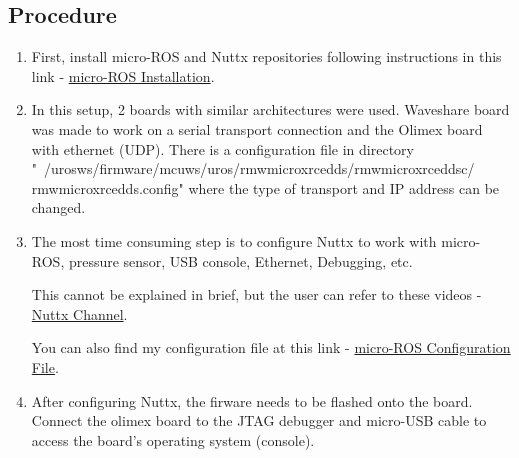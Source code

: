 \documentclass[%
xelatex,
	oneside,		%
	12pt,			%
	parskip=half,	%
	abstracton,
	chapterprefix=true%
    appendixprefix=true]
{scrbook}
\begin{document}
	\subsection{Procedure}	
	\vspace*{0.5cm}
	\begin{enumerate}
	\item First, install micro-ROS and Nuttx repositories following instructions in this link - \href{https://micro-ros.github.io/docs/tutorials/basic/getting_started/}{micro-ROS Installation}\cite{urosinstall}.
	\item In this setup, 2 boards with similar architectures were used. Waveshare board was made to work on a serial transport connection and the Olimex board with ethernet (UDP). There is a configuration file in directory "~/uros\textunderscore ws/firmware/mcu\textunderscore ws/uros/rmw\textunderscore microxrcedds/rmw\textunderscore microxrcedds\textunderscore c/\linebreak
	rmw\textunderscore microxrcedds.config" where the type of transport and IP address can be changed.
	\item The most time consuming step is to configure Nuttx to work with micro-ROS, pressure sensor, USB console, Ethernet, Debugging, etc. 
	
	This cannot be explained in brief, but the user can refer to these videos - \href{https://www.youtube.com/channel/UC0QciIlcUnjJkL5yJJBmluw/videos}{Nuttx Channel}\cite{Nuttxchannel}. 
	
	You can also find my configuration file at this link - \href{https://github.com/Viplav04/NuttX/tree/master/configs/olimex-stm32-e407/uros}{micro-ROS Configuration File}\cite{olimexconfigfile}.
	\item After configuring Nuttx, the firware needs to be flashed onto the board. Connect the olimex board to the JTAG debugger and micro-USB cable to access the board's operating system (console). 
	

\end{enumerate}
\end{document}
